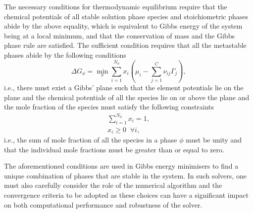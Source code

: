     	The necessary conditions for thermodynamic equilibrium require that the chemical potentials of all stable solution phase species and stoichiometric phases abide by the above equality, which is equivalent to Gibbs energy of the system being at a local minimum, and that the conservation of mass and the Gibbs phase rule are satisfied. The sufficient condition requires that all the metastable phases abide by the following conditions
    	\begin{equation*}
        		\Delta G_{\phi} = \min_{x} \sum_{i=1}^{N_{\phi}}x_{i} \left (\mu_{i} - \sum_{j=1}^C \nu_{ij}\Gamma_j \right ),
    	\end{equation*}
    	i.e., there must exist a Gibbs' plane such that the element potentials lie on the plane and the chemical potentials of all the species lie on or above the plane and the mole fraction of the species must satisfy the following constraints
	\begin{equation*}
        		\begin{aligned}
            		\sum_{i=1}^{N_{\phi}}x_{i} = 1, \\
			x_{i} \geq 0 \;\; \forall i,
        		\end{aligned}
    	\end{equation*}
    	i.e., the sum of mole fraction of all the species in a phase $\phi$ must be unity and that the individual mole fractions must be greater than or equal to zero.

    	The aforementioned conditions are used in Gibbs energy minimisers to find a unique combination of phases that are stable in the system. In such solvers, one must also carefully consider the role of the numerical algorithm and the convergence criteria to be adopted as these choices can have a significant impact on both computational performance and robustness of the solver.
